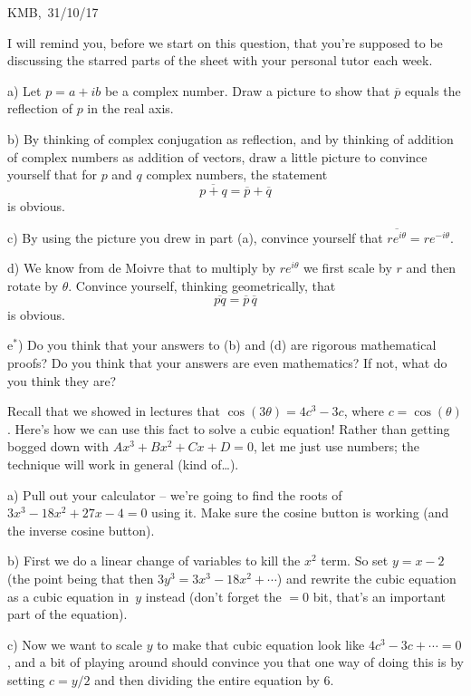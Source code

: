\documentclass[10pt]{article}
\begin{document}
\begin{flushright} KMB,\ 31/10/17\end{flushright}


\medskip
{} I will remind you, before we start on this question, that you're supposed to be discussing the starred parts of the sheet with your personal tutor each week.

a) Let $p=a+ib$ be a complex number. Draw a picture to show that $\overline{p}$ equals the reflection of $p$ in the real axis.

b) By thinking of complex conjugation as reflection, and by thinking of addition of complex numbers as addition of vectors, draw a little picture to convince yourself that for $p$ and $q$ complex numbers, the statement
$$\overline{p+q}=\overline{p}+\overline{q}$$
is obvious.

c) By using the picture you drew in part (a), convince yourself that $\overline{re^{i\theta}}=re^{-i\theta}$. 

d) We know from de Moivre that to multiply by $re^{i\theta}$ we first scale by $r$ and then rotate by $\theta$. Convince yourself, thinking geometrically, that
$$\overline{pq}=\overline{p}\,\overline{q}$$
is obvious.

e${}^*$) Do you think that your answers to (b) and (d) are rigorous mathematical proofs? Do you think that your answers are even mathematics? If not, what do you think they are?

\medskip
{} Recall that we showed in lectures that $\cos(3\theta)=4c^3-3c$, where $c=\cos(\theta)$. Here's how we can use this fact to solve a cubic equation! Rather than getting bogged down with $Ax^3+Bx^2+Cx+D=0$, let me just use numbers; the technique will work in general (kind of\ldots).

a) Pull out your calculator -- we're going to find the roots of $3x^3 - 18x^2 + 27x - 4=0$ using it. Make sure the cosine button is working (and the inverse cosine button).

b) First we do a linear change of variables to kill the $x^2$ term. So set $y=x-2$ (the point being that then $3y^3=3x^3 - 18x^2 + \cdots$) and rewrite the cubic equation as a cubic equation in~$y$ instead (don't forget the $=0$ bit, that's an important part of the equation).

c) Now we want to scale $y$ to make that cubic equation look like $4c^3-3c+\cdots=0$, and a bit of playing around should convince you that one way of doing this is by setting $c=y/2$ and then dividing the entire equation by 6.
\end{document}
